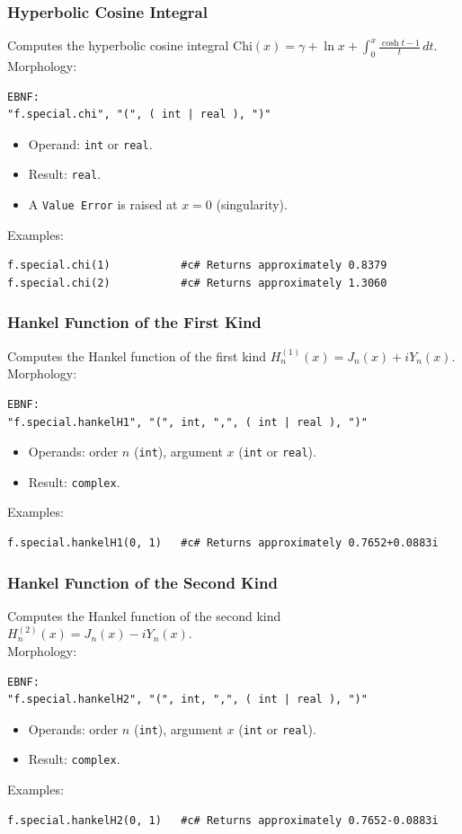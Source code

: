 \subsubsection{Hyperbolic Cosine Integral}
Computes the hyperbolic cosine integral $\text{Chi}(x) = \gamma + \ln x + \int_0^x \frac{\cosh t - 1}{t}\,dt$. \\
Morphology:
\begin{verbatim}
EBNF:
"f.special.chi", "(", ( int | real ), ")"
\end{verbatim}
\begin{itemize}
\item Operand: \texttt{int} or \texttt{real}.
\item Result: \texttt{real}.
\item A \texttt{Value Error} is raised at $x = 0$ (singularity).
\end{itemize}
Examples:
\begin{verbatim}
f.special.chi(1)           #c# Returns approximately 0.8379
f.special.chi(2)           #c# Returns approximately 1.3060
\end{verbatim}

\subsubsection{Hankel Function of the First Kind}
Computes the Hankel function of the first kind $H_n^{(1)}(x) = J_n(x) + i Y_n(x)$. \\
Morphology:
\begin{verbatim}
EBNF:
"f.special.hankelH1", "(", int, ",", ( int | real ), ")"
\end{verbatim}
\begin{itemize}
\item Operands: order $n$ (\texttt{int}), argument $x$ (\texttt{int} or \texttt{real}).
\item Result: \texttt{complex}.
\end{itemize}
Examples:
\begin{verbatim}
f.special.hankelH1(0, 1)   #c# Returns approximately 0.7652+0.0883i
\end{verbatim}

\subsubsection{Hankel Function of the Second Kind}
Computes the Hankel function of the second kind $H_n^{(2)}(x) = J_n(x) - i Y_n(x)$. \\
Morphology:
\begin{verbatim}
EBNF:
"f.special.hankelH2", "(", int, ",", ( int | real ), ")"
\end{verbatim}
\begin{itemize}
\item Operands: order $n$ (\texttt{int}), argument $x$ (\texttt{int} or \texttt{real}).
\item Result: \texttt{complex}.
\end{itemize}
Examples:
\begin{verbatim}
f.special.hankelH2(0, 1)   #c# Returns approximately 0.7652-0.0883i
\end{verbatim}

